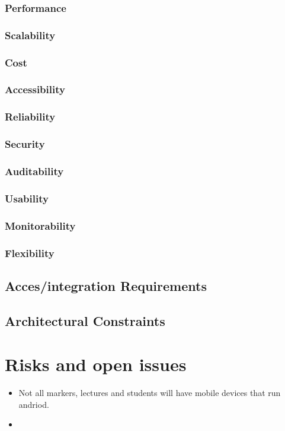 \documentclass[12pt,a4paper]{article}
\begin{document}
\subsubsection{Performance}
\subsubsection{Scalability}
\subsubsection{Cost}
\subsubsection{Accessibility}
\subsubsection{Reliability}
\subsubsection{Security}
\subsubsection{Auditability}
\subsubsection{Usability}
\subsubsection{Monitorability}
\subsubsection{Flexibility}
\subsection{Acces/integration Requirements}
\subsection{Architectural Constraints}
\pagebreak
\section{Risks and open issues}
\begin{itemize}
\item Not all markers, lectures and students will have mobile devices that run andriod.
\item 
\end{itemize}
\end{document}
